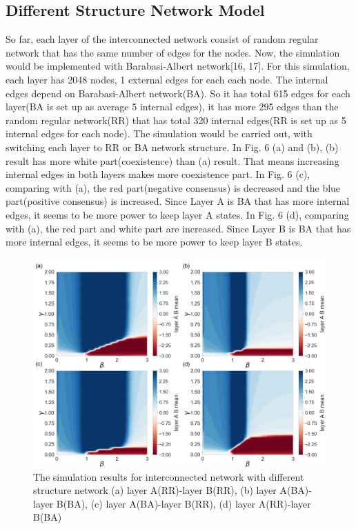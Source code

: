 \documentclass[english]{cccconf}
\begin{document}
\subsection{Different Structure Network Model}
So far, each layer of the interconnected network consist of random regular network that has the same number of edges for the nodes. Now, the simulation would be implemented with Barabasi-Albert network[16, 17]. For this simulation, each layer has 2048 nodes, 1 external edges for each each node. The internal edges depend on Barabasi-Albert network(BA). So it has total 615 edges for each layer(BA is set up as average 5 internal edges), it has more 295 edges than the random regular network(RR) that has total 320 internal edges(RR is set up as 5 internal edges for each node). The simulation would be carried out, with switching each layer to RR or BA network structure. 
In Fig. 6 (a) and (b), (b) result has more white part(coexistence) than (a) result. That means increasing internal edges in both layers makes more coexistence part.
In Fig. 6 (c), comparing with (a), the red part(negative consensus) is decreased and the blue part(positive consensus) is increased. Since Layer A is BA that has more internal edges, it seems to be more power to keep layer A states. 
In Fig. 6 (d), comparing with (a), the red part and white part are increased. Since Layer B is BA that has more internal edges, it seems to be more power to keep layer B states.
\begin{figure}[!htb]
  \centering
  \includegraphics[width=\hsize]{FIG6.png}
  \caption{The simulation results for interconnected network with different structure network (a) layer A(RR)-layer B(RR), (b) layer A(BA)-layer B(BA), (c) layer A(BA)-layer B(RR), (d) layer A(RR)-layer B(BA)}
  \label{Fig6}
\end{figure}
\end{document}
